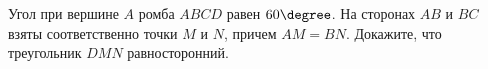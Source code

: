 \begin{ex}
	\begin{condition}
		Угол при вершине \( A  \) ромба \( ABCD  \) равен \( 60\degree \). На сторонах \( AB  \) и \( BC  \) взяты соответственно точки \( M  \) и \( N  \), причем \( AM = BN  \). Докажите, что треугольник \( DMN  \) равносторонний.
	\end{condition}
\end{ex}